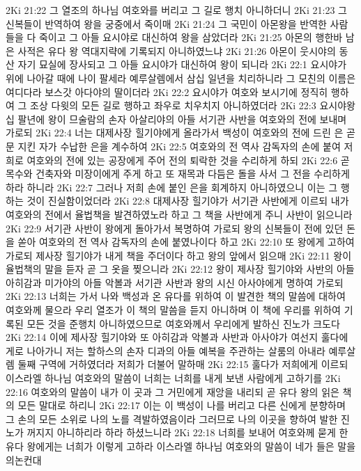 2Ki 21:22  그 열조의 하나님 여호와를 버리고 그 길로 행치 아니하더니
2Ki 21:23  그 신복들이 반역하여 왕을 궁중에서 죽이매
2Ki 21:24  그 국민이 아몬왕을 반역한 사람들을 다 죽이고 그 아들 요시야로 대신하여 왕을 삼았더라
2Ki 21:25  아몬의 행한바 남은 사적은 유다 왕 역대지략에 기록되지 아니하였느냐
2Ki 21:26  아몬이 웃시야의 동산 자기 묘실에 장사되고 그 아들 요시야가 대신하여 왕이 되니라
2Ki 22:1  요시야가 위에 나아갈 때에 나이 팔세라 예루살렘에서 삼십 일년을 치리하니라 그 모친의 이름은 여디다라 보스갓 아다야의 딸이더라
2Ki 22:2  요시야가 여호와 보시기에 정직히 행하여 그 조상 다윗의 모든 길로 행하고 좌우로 치우치지 아니하였더라
2Ki 22:3  요시야왕 십 팔년에 왕이 므술람의 손자 아살리야의 아들 서기관 사반을 여호와의 전에 보내며 가로되
2Ki 22:4  너는 대제사장 힐기야에게 올라가서 백성이 여호와의 전에 드린 은 곧 문 지킨 자가 수납한 은을 계수하여
2Ki 22:5  여호와의 전 역사 감독자의 손에 붙여 저희로 여호와의 전에 있는 공장에게 주어 전의 퇴락한 것을 수리하게 하되
2Ki 22:6  곧 목수와 건축자와 미장이에게 주게 하고 또 재목과 다듬은 돌을 사서 그 전을 수리하게 하라 하니라
2Ki 22:7  그러나 저희 손에 붙인 은을 회계하지 아니하였으니 이는 그 행하는 것이 진실함이었더라
2Ki 22:8  대제사장 힐기야가 서기관 사반에게 이르되 내가 여호와의 전에서 율법책을 발견하였노라 하고 그 책을 사반에게 주니 사반이 읽으니라
2Ki 22:9  서기관 사반이 왕에게 돌아가서 복명하여 가로되 왕의 신복들이 전에 있던 돈을 쏟아 여호와의 전 역사 감독자의 손에 붙였나이다 하고
2Ki 22:10  또 왕에게 고하여 가로되 제사장 힐기야가 내게 책을 주더이다 하고 왕의 앞에서 읽으매
2Ki 22:11  왕이 율법책의 말을 듣자 곧 그 옷을 찢으니라
2Ki 22:12  왕이 제사장 힐기야와 사반의 아들 아히감과 미가야의 아들 악볼과 서기관 사반과 왕의 시신 아사야에게 명하여 가로되
2Ki 22:13  너희는 가서 나와 백성과 온 유다를 위하여 이 발견한 책의 말씀에 대하여 여호와께 물으라 우리 열조가 이 책의 말씀을 듣지 아니하며 이 책에 우리를 위하여 기록된 모든 것을 준행치 아니하였으므로 여호와께서 우리에게 발하신 진노가 크도다
2Ki 22:14  이에 제사장 힐기야와 또 아히감과 악볼과 사반과 아사야가 여선지 훌다에게로 나아가니 저는 할하스의 손자 디과의 아들 예복을 주관하는 살룸의 아내라 예루살렘 둘째 구역에 거하였더라 저희가 더불어 말하매
2Ki 22:15  훌다가 저희에게 이르되 이스라엘 하나님 여호와의 말씀이 너희는 너희를 내게 보낸 사람에게 고하기를
2Ki 22:16  여호와의 말씀이 내가 이 곳과 그 거민에게 재앙을 내리되 곧 유다 왕의 읽은 책의 모든 말대로 하리니
2Ki 22:17  이는 이 백성이 나를 버리고 다른 신에게 분향하며 그 손의 모든 소위로 나의 노를 격발하였음이라 그러므로 나의 이곳을 향하여 발한 진노가 꺼지지 아니하리라 하라 하셨느니라
2Ki 22:18  너희를 보내어 여호와께 묻게 한 유다 왕에게는 너희가 이렇게 고하라 이스라엘 하나님 여호와의 말씀이 네가 들은 말을 의논컨대
